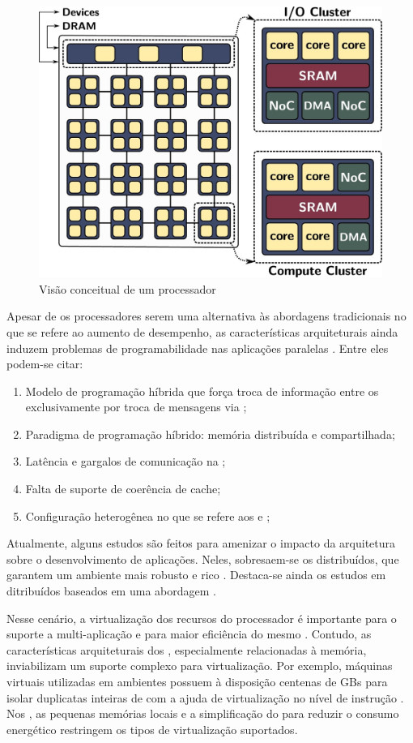 \begin{figure}[bt]
	\label{fig.lw-overview}
	\centering
    \includegraphics[width=0.64\linewidth]{content/images/lw-overview.jpg}
	\caption{Visão conceitual de um processador \lw \cite{penna2021inter}}
\end{figure}


Apesar de os processadores \lws serem uma alternativa às abordagens tradicionais no que se refere ao aumento de desempenho, as características arquiteturais ainda induzem problemas de programabilidade nas aplicações paralelas \cite{Castro-PARCO:2016}. Entre eles podem-se citar:

\begin{enumerate}[label=(\roman*)]
    \item Modelo de programação híbrida que força troca de informação entre os \clusters exclusivamente por troca de mensagens via \noc;
    \item Paradigma de programação híbrido: memória distribuída e compartilhada;
    \item Latência e gargalos de comunicação na \noc;
    \item Falta de suporte de coerência de cache;
    \item Configuração heterogênea no que se refere aos \cclusters e \ioclusters;
\end{enumerate}

Atualmente, alguns estudos são feitos para amenizar o impacto da arquitetura sobre o desenvolvimento de aplicações. Neles, sobresaem-se os \oss distribuídos, que garantem um ambiente mais robusto e rico \cite{asmussen_m3:_2016, kluge_operating_2014, penna:sbesc19}. Destaca-se ainda os estudos em \oss ditribuídos baseados em uma abordagem \multikernel \cite{penna2017-1,penna2017-2,penna2019}.

Nesse cenário, a virtualização dos recursos do processador é importante para o suporte a multi-aplicação e para maior eficiência do mesmo \cite{vanz2022virtualizaccao}. Contudo, as características arquiteturais dos \lws, especialmente relacionadas à memória, inviabilizam um suporte complexo para virtualização. Por exemplo, máquinas virtuais utilizadas em ambientes \cloud possuem à disposição centenas de GBs para isolar duplicatas inteiras de \oss com a ajuda de virtualização no nível de instrução \cite{sharma2016containers}. Nos \lws, as pequenas memórias locais e a simplificação do \hardware para reduzir o consumo energético restringem os tipos de virtualização suportados.

